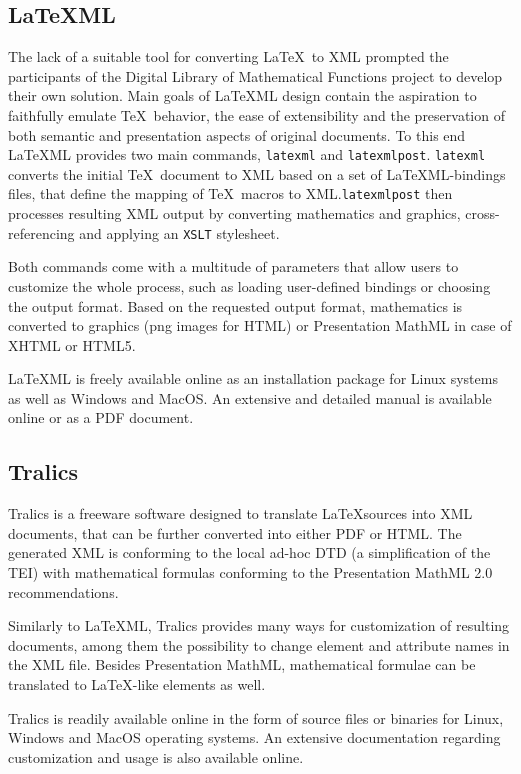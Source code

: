\documentclass[11pt,oneside,final]{fithesis2}
\begin{document}
\subsection{\LaTeX ML}
The lack of a suitable tool for converting \LaTeX\ to XML prompted the participants of the Digital Library of Mathematical Functions project to develop their own solution. Main goals of \LaTeX ML design contain the aspiration to faithfully emulate \TeX\ behavior, the ease of extensibility and the preservation of both semantic and presentation aspects of original documents. To this end \LaTeX ML provides two main commands, \texttt{latexml} and \texttt{latexmlpost}. \texttt{latexml} converts the initial \TeX\ document to XML based on a set of \LaTeX ML-bindings files, that define the mapping of \TeX\ macros to XML.\texttt{latexmlpost} then processes resulting XML output by converting mathematics
and graphics, cross-referencing and applying an \texttt{XSLT} stylesheet. 

Both commands come with a multitude of parameters that allow users to customize the whole process, such as loading user-defined bindings or choosing the output format. Based on the requested output format, mathematics is converted to graphics (png images for HTML) or Presentation MathML in case of XHTML or HTML5. 

\LaTeX ML is freely available online as an installation package for Linux systems as well as Windows and MacOS. An extensive and detailed manual is available online or as a PDF document.

\subsection{Tralics}
Tralics is a freeware software designed to translate \LaTeX sources into XML documents, that can be further converted into either PDF or HTML. The generated XML is conforming to the local ad-hoc DTD (a simplification of the TEI) with mathematical formulas conforming to the Presentation MathML 2.0 recommendations.

Similarly to \LaTeX ML, Tralics provides many ways for customization of resulting documents, among them the possibility to change element and attribute names in the XML file. Besides Presentation MathML, mathematical formulae can be translated to \LaTeX -like   elements as well.

Tralics is readily available online in the form of source files or binaries for Linux, Windows and MacOS operating systems. An extensive documentation regarding customization and usage is also available online. 
\end{document}
